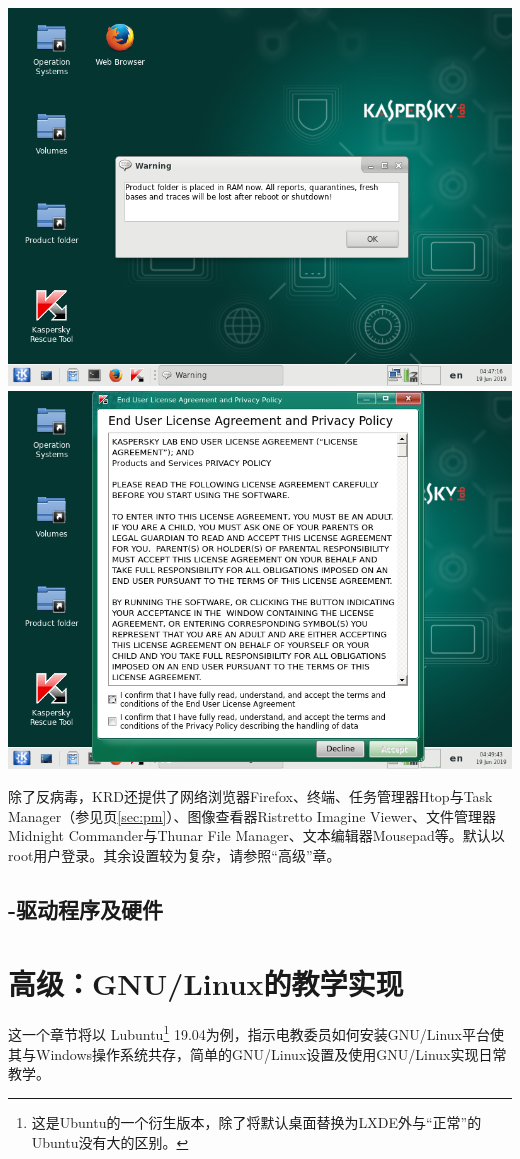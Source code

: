 \documentclass{book}
\begin{document}
\begin{center}
	\includegraphics[scale=0.35]{pic/krd4}	\includegraphics[scale=0.35]{pic/krd5}
\end{center}
除了反病毒，KRD还提供了网络浏览器Firefox、终端、任务管理器Htop与Task Manager（参见\pageref{sec:pm}页\ref{sec:pm}）、图像查看器Ristretto Imagine Viewer、文件管理器Midnight Commander与Thunar File Manager、文本编辑器Mousepad等。默认以root用户登录。其余设置较为复杂，请参照“高级”章。
\section{-驱动程序及硬件}
\chapter{高级：GNU/Linux的教学实现}
这一个章节将以 Lubuntu\footnote{这是Ubuntu的一个衍生版本，除了将默认桌面替换为LXDE外与“正常”的Ubuntu没有大的区别。} 19.04为例，指示电教委员如何安装GNU/Linux平台使其与Windows操作系统共存，简单的GNU/Linux设置及使用GNU/Linux实现日常教学。\par
\end{document}
